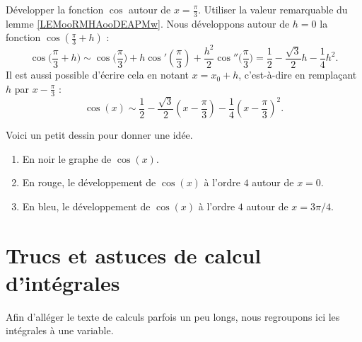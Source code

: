 \begin{example}     \label{developcosenpisur3}
	Développer la fonction \( \cos\) autour de \( x=\frac{ \pi }{ 3 }\). Utiliser la valeur remarquable du lemme \ref{LEMooRMHAooDEAPMw}. Nous développons autour de \( h=0\) la fonction \( \cos(\frac{ \pi }{ 3 }+h)\) :
	\begin{equation}
		\cos\big( \frac{ \pi }{ 3 }+h \big)\sim \cos\big( \frac{ \pi }{ 3 } \big)+h\cos'(\frac{ \pi }{ 3 })+\frac{ h^2 }{2}\cos''\big( \frac{ \pi }{ 3 } \big)=\frac{ 1 }{2}-\frac{ \sqrt{3} }{2}h-\frac{1}{ 4 }h^2.
	\end{equation}
	Il est aussi possible d'écrire cela en notant \( x=x_0+h\), c'est-à-dire en remplaçant \( h\) par \( x-\frac{ \pi }{ 3 }\) :
	\begin{equation}
		\cos(x)\sim\frac{ 1 }{2}-\frac{ \sqrt{3} }{ 2 }(x-\frac{ \pi }{ 3 })-\frac{1}{ 4 }(x-\frac{ \pi }{ 3 })^2.
	\end{equation}
\end{example}

\begin{normaltext}
	Voici un petit dessin pour donner une idée.
	\begin{center}
		
	\end{center}
	\begin{enumerate}
		\item
		      En noir le graphe de \( \cos(x)\).
		\item
		      En rouge, le développement de \( \cos(x)\) à l'ordre \( 4\) autour de \( x=0\).
		\item
		      En bleu, le développement de \( \cos(x)\) à l'ordre \( 4\) autour de \( x=3\pi/4\).
	\end{enumerate}
\end{normaltext}



\section{Trucs et astuces de calcul d'intégrales}
\label{SECooKSOFooEVKDLh}

Afin d'alléger le texte de calculs parfois un peu longs, nous regroupons ici les intégrales à une variable.

